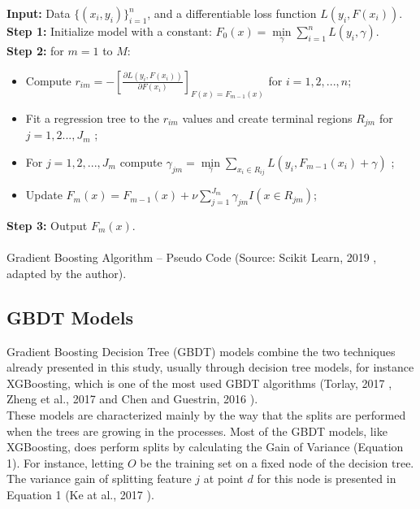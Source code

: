 \documentclass[letterpaper, 10 pt, conference]{ieeeconf}  %
\begin{document}
\begin{algorithm}
\SetAlgoLined
\textbf{Input:} Data $\{(x_i,y_i)\}_{i=1}^n$, and a differentiable loss function $L(y_i,F(x_i))$.\\	
\textbf{Step 1:} Initialize model with a constant: $F_0(x)=\underset{\gamma}{\min}\sum_{i=1}^nL(y_i,\gamma)$.\\
\textbf{Step 2:} for $m=1$ to $M$:
\begin{itemize}
\item Compute $r_{im}=-\left[\frac{\partial L(y_i,F(x_i))}{\partial F(x_i)}\right]_{F(x)=F_{m-1}(x)}$ for $i=1,2,...,n$; 
\item Fit a regression tree to the $r_{im}$ values and create terminal regions $R_{jm}$ for $j=1,2...,J_m$ ;
\item For $j=1,2,..., J_m$ compute $\gamma_{jm}=\underset{\gamma}{\min} \sum_{x_i\in R_{ij}}L(y_i,F_{m-1}(x_i)+\gamma)$ ;
\item Update $F_m(x)=F_{m-1}(x)+\nu \sum_{j=1}^{J_m} \gamma_{jm} I(x \in R_{jm})$;
\end{itemize}
\textbf{Step 3:} Output $F_m(x)$.\\~\\
\caption{Gradient Boosting Algorithm -- Pseudo Code (Source: Scikit Learn, 2019 \cite{scikitlearn_2019}, adapted by the author).}
\end{algorithm}

\subsection{GBDT Models}
Gradient Boosting Decision Tree (GBDT) models combine the two techniques already presented in this study, usually through decision tree models, for instance XGBoosting, which is one of the most used GBDT algorithms (Torlay, 2017 \cite{Torlay2017}, Zheng et al., 2017 \cite{Zheng2017} and Chen and Guestrin, 2016 \cite{ChenGuestrin2016}).\\

These models are characterized mainly by the way that the splits are performed when the trees are growing in the processes. Most of the GBDT models, like XGBoosting, does perform splits by calculating the Gain of Variance (Equation 1). For instance, letting $O$ be the training set on a fixed node of the decision tree. The variance gain of splitting feature $j$ at point $d$ for this node is presented in Equation 1 (Ke at al., 2017 \cite{LGBM}).
\end{document}
